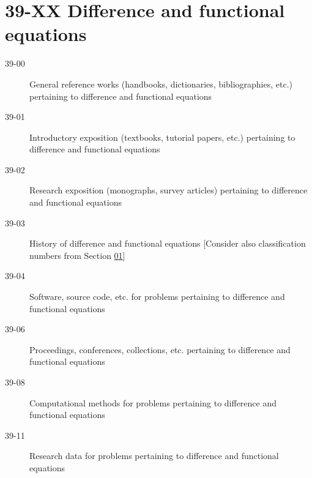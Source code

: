 \section*{39-XX Difference and functional equations }\label{39-XX}
\begin{description}
\item [39-00]\label{39-00} General reference works (handbooks, dictionaries, bibliographies, etc.) pertaining to difference and functional equations
\item [39-01]\label{39-01} Introductory exposition (textbooks, tutorial papers, etc.) pertaining to difference and functional equations
\item [39-02]\label{39-02} Research exposition (monographs, survey articles) pertaining to difference and functional equations
\item [39-03]\label{39-03} History of difference and functional equations [Consider also classification numbers from Section \hyperref[01-XX]{01}]
\item [39-04]\label{39-04} Software, source code, etc. for problems pertaining to difference and functional equations
\item [39-06]\label{39-06} Proceedings, conferences, collections, etc. pertaining to difference and functional equations
\item [39-08]\label{39-08} Computational methods for problems pertaining to difference and functional equations
\item [39-11]\label{39-11} Research data for problems pertaining to difference and functional equations
\end{description}
